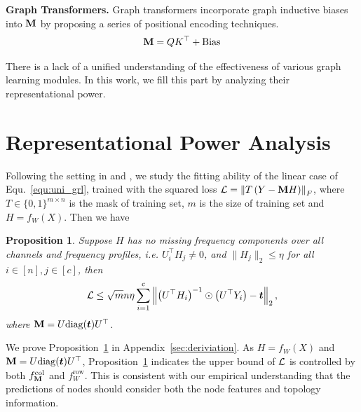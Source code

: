 \documentclass{article} %
\newtheorem{proposition}{\textbf{Proposition}} %
\begin{document}
\textbf{Graph Transformers.}
Graph transformers incorporate graph inductive biases into ${\mathbf{M}}$ by proposing a series of positional encoding techniques.
\begin{equation}
	\begin{aligned}
		{\mathbf{M}}=QK^{\top}+\textrm{Bias}
	\end{aligned}
\end{equation}

There is a lack of a unified understanding of the effectiveness of various graph learning modules.
In this work, we fill this part by analyzing their representational power.

\section{Representational Power Analysis}


Following the setting in \citet{xu2021optimization} and \citet{JacobiConv}, we study the fitting ability of the linear case of Equ.~\ref{equ:uni_grl}, trained with the squared loss ${\mathcal{L}}=\left\|T\left(Y-{\mathbf{M}} H\right)\right\|_F$, where $T\in\{0,1\}^{m\times n}$ is the mask of training set, $m$ is the size of training set and $H=f_W(X)$.
Then we have
\begin{proposition}
	\label{prop:loss_bound}
	Suppose $H$ has no missing frequency components over all channels and frequency profiles, i.e. $U_i^{\top}H_j\neq 0$, and $\|H_j\|_2\leq\eta$ for all $i\in[n],j\in[c]$, then
	\begin{equation}
		\label{equ:loss_bound}
		\begin{aligned}
			{\mathcal{L}}\leq\sqrt{m}n\eta\sum_{i=1}^c\left\|\left(U^{\top}H_i\right)^{-1}\odot\left(U^{\top}Y_i\right)-{\bm{t}}\right\|_2,
		\end{aligned}
	\end{equation}
	where ${\mathbf{M}}=U\mathrm{diag}({\bm{t}})U^{\top}$.
\end{proposition}
We prove Proposition~\ref{prop:loss_bound} in Appendix~\ref{sec:deriviation}.
As $H=f_W(X)$ and ${\mathbf{M}}=U\mathrm{diag}({\bm{t}})U^{\top}$, Proposition~\ref{prop:loss_bound} indicates the upper bound of ${\mathcal{L}}$ is controlled by both $f_{{\mathbf{M}}}^{\mathrm{col}}$ and $f_W^{\mathrm{row}}$.
This is consistent with our empirical understanding that the predictions of nodes should consider both the node features and topology information.
\end{document}
